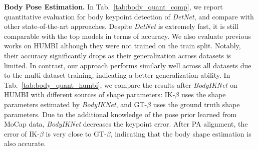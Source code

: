 \documentclass[final]{cvpr}
\begin{document}
\par
\noindent \textbf{Body Pose Estimation.}
In Tab.~\ref{tab:body_quant_comp}, we report quantitative evaluation for body keypoint detection of \textit{DetNet}, and compare with other state-of-the-art approaches.
Despite \textit{DetNet} is extremely fast, it is still comparable with the top models in terms of accuracy.
We also evaluate previous works on HUMBI although they were not trained on the train split.
Notably, their accuracy significantly drops as their generalization across datasets is limited.
In contrast, our approach performs similarly well across all datasets due to the multi-dataset training, indicating a better generalization ability.
In Tab.~\ref{tab:body_quant_humbi}, we compare the results after \textit{BodyIKNet} on HUMBI with different sources of shape parameters: IK-$\beta$ uses the shape parameters estimated by \textit{BodyIKNet}, and GT-$\beta$ uses the ground truth shape parameters.
Due to the additional knowledge of the pose prior learned from MoCap data, \textit{BodyIKNet} decreases the keypoint error.
After PA alignment, the error of IK-$\beta$ is very close to GT-$\beta$, indicating that the body shape estimation is also accurate.
\begin{table}[t]
  \centering
  \caption{
Body MPJPE on public datasets.
Our model has competitive results across all datasets while being much faster.
$^\mathsection$ means the model is not trained on the train split.
}
  \label{tab:body_quant_comp}
\end{table}
\end{document}
